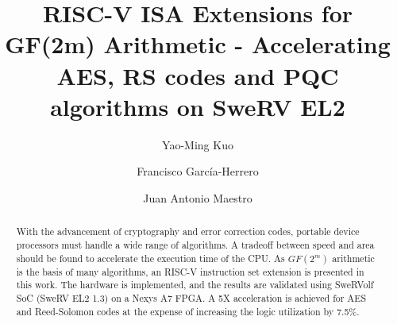 \documentclass[sigconf]{acmart}
\begin{document}
\title{RISC-V ISA Extensions for GF(2m) Arithmetic - Accelerating AES, RS codes and PQC algorithms on SweRV EL2}

\author{Yao-Ming Kuo}
\author{Francisco García-Herrero}
\author{Juan Antonio Maestro}


\begin{abstract}
  With the advancement of cryptography and error correction codes, portable device processors 
  must handle a wide range of algorithms. A tradeoff between speed and area should be found to 
  accelerate the execution time of the CPU. As $GF(2^m)$ arithmetic is the basis of many algorithms, 
  an RISC-V instruction set extension is presented in this work. The hardware is implemented, and the 
  results are validated using SweRVolf SoC (SweRV EL2 1.3) on a Nexys A7 FPGA. A 5X acceleration 
  is achieved for AES and Reed-Solomon codes at the expense of increasing the logic utilization by 7.5\%.
\end{abstract}

\end{document}
